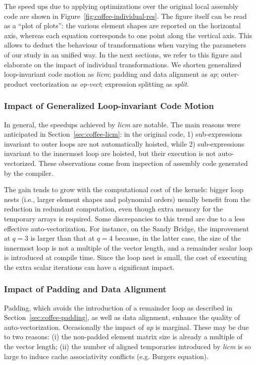 The speed ups due to applying optimizations over the original local assembly code are shown in Figure~\ref{fig:coffee-individual-res}. The figure itself can be read as a ``plot of plots'': the various element shapes are reported on the horizontal axis, whereas each equation corresponds to one point along the vertical axis. This allows to deduct the behaviour of transformations when varying the parameters of our study in an unified way. In the next sections, we refer to this figure and elaborate on the impact of individual transformations. We shorten generalized loop-invariant code motion as \emph{licm}; padding and data alignment as \emph{ap}; outer-product vectorization as \emph{op-vect}; expression splitting as \emph{split}.

\subsubsection{Impact of Generalized Loop-invariant Code Motion}
\label{sec:perf-eval-licm}

In general, the speedups achieved by \emph{licm} are notable. The main reasons were anticipated in Section~\ref{sec:coffee-licm}: in the original code, 1) sub-expressions invariant to outer loops are not automatically hoisted, while 2) sub-expressions invariant to the innermost loop are hoisted, but their execution is not auto-vectorized. These observations come from inspection of assembly code generated by the compiler.

The gain tends to grow with the computational cost of the kernels: bigger loop nests (i.e., larger element shapes and polynomial orders) usually benefit from the reduction in redundant computation, even though extra memory for the temporary arrays is required. Some discrepancies to this trend are due to a less effective auto-vectorization. For instance, on the Sandy Bridge, the improvement at $q=3$ is larger than that at $q=4$ because, in the latter case, the size of the innermost loop is not a multiple of the vector length, and a remainder scalar loop is introduced at compile time. Since the loop nest is small, the cost of executing the extra scalar iterations can have a significant impact.

\subsubsection{Impact of Padding and Data Alignment}
\label{sec:perf-eval-padding}

Padding, which avoids the introduction of a remainder loop as described in Section~\ref{sec:coffee-padding}, as well as data alignment, enhance the quality of auto-vectorization. Occasionally the impact of \emph{ap} is marginal. These may be due to two reasons: (i) the non-padded element matrix size is already a multiple of the vector length; (ii) the number of aligned temporaries introduced by \emph{licm} is so large to induce cache associativity conflicts (e.g. Burgers equation).

